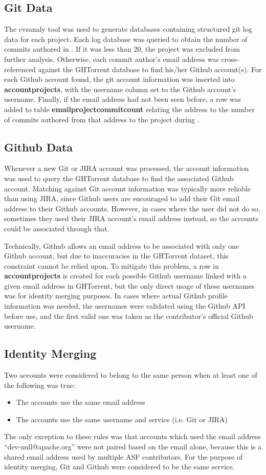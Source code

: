\subsection{Git Data}
The cvsanaly tool was used to generate databases containing structured git log data for each project. Each log database was queried to obtain the number of commits authored in \timeperiod. If it was less than 20, the project was excluded from further analysis. Otherwise, each commit author's email address was cross-referenced against the GHTorrent database to find his/her Github account(s). For each Github account found, the git account information was inserted into \textbf{accountprojects}, with the username column set to the Github account's username. Finally, if the email address had not been seen before, a row was added to table \textbf{emailprojectcommitcount} relating the address to the number of commits authored from that address to the project during \timeperiod.
\subsection{Github Data}
Whenever a new Git or JIRA account was processed, the account information was used to query the GHTorrent database to find the associated Github account. Matching against Git account information was typically more reliable than using JIRA, since Github users are encouraged to add their Git email address to their Github accounts. However, in cases where the user did not do so, sometimes they used their JIRA account's email address instead, so the accounts could be associated through that.

Technically, Github allows an email address to be associated with only one Github account, but due to inaccuracies in the GHTorrent dataset, this constraint cannot be relied upon. To mitigate this problem, a row in \textbf{accountprojects} is created for each possible Github username linked with a given email address in GHTorrent, but the only direct usage of these usernames was for identity merging purposes. In cases where actual Github profile information was needed, the usernames were validated using the Github API before use, and the first valid one was taken as the contributor's official Github username.
\subsection{Identity Merging}
Two accounts were considered to belong to the same person when at least one of the following was true:
\begin{itemize}
	\item The accounts use the same email address
	\item The accounts use the same username and service (i.e. Git or JIRA)
\end{itemize}
The only exception to these rules was that accounts which used the email address ``dev-null@apache.org'' were not paired based on the email alone, because this is a shared email address used by multiple ASF contributors. For the purpose of identity merging, Git and Github were considered to be the same service.

